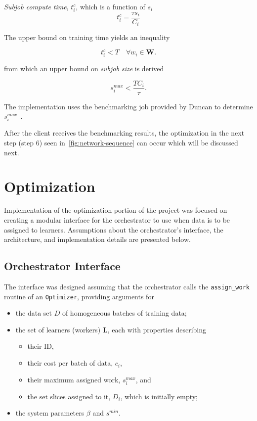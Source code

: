 \documentclass[../mthe-493-final-project.tex]{subfiles}
\begin{document}
    \textit{Subjob compute time}, $t^c_i$, which is a function of $s_i$
                  \[t^c_i = \frac{\tau s_i}{C_i}\]

    The upper bound on training time yields an inequality

    \[t^c_i < T \quad \forall w_i \in \mathbf{W}.\]

    from which an upper bound on \textit{subjob size} is derived

    \[s^{max}_i < \frac{T C_i}{\tau}.\]

    The implementation uses the benchmarking job provided by Duncan to determine $s^{max}_i$~\cite{group_a2_Optimization_Of_Data}\cite{mays_benchmark_nodate}.

    After the client receives the benchmarking results, the optimization in the next step (step 6) seen in~\autoref{fig:network-sequence} can occur which will be discussed next.
    
    \section{Optimization}
    \label{sec:optimization-implementation}
    
    Implementation of the optimization portion of the project was focused on creating a modular interface for the orchestrator to use when data is to be assigned to learners. Assumptions about the orchestrator's interface, the architecture, and implementation details are presented below.
    
    \subsection{Orchestrator Interface}
    \label{ssec:optimization-orchestrator-interface}
    
    The interface was designed assuming that the orchestrator calls the \texttt{assign\_work} routine of an \texttt{Optimizer}, providing arguments for
    
    \begin{itemize}
        \item the data set $D$ of homogeneous batches of training data;
        \item the set of learners (workers) $\mathbf{L}$, each with properties describing
        \begin{itemize}
            \item their ID,
            \item their cost per batch of data, $c_i$,
            \item their maximum assigned work, $s^{max}_i$, and
            \item the set slices assigned to it, $D_i$, which is initially empty;
        \end{itemize}
        \item the system parameters $\beta$ and $s^{min}$.
    \end{itemize}
    
\end{document}
